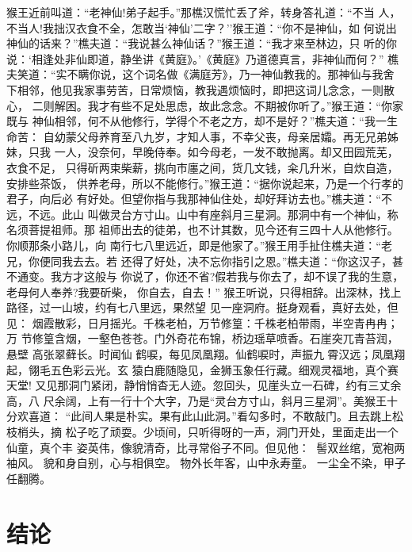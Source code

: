 \documentclass[]{style/zjuthesis}
\begin{document}
猴王近前叫道：``老神仙!弟子起手。''那樵汉慌忙丢了斧，转身答礼道：``不当
人，不当人!我拙汉衣食不全，怎敢当`神仙'二字？''猴王道：``你不是神仙，如
何说出神仙的话来？''樵夫道：``我说甚么神仙话？''猴王道：``我才来至林边，只
听的你说：`相逢处非仙即道，静坐讲《黄庭》。'《黄庭》乃道德真言，非神仙而何？''
樵夫笑道：``实不瞒你说，这个词名做《满庭芳》，乃一神仙教我的。那神仙与我舍
下相邻，他见我家事劳苦，日常烦恼，教我遇烦恼时，即把这词儿念念，一则散心，
二则解困。我才有些不足处思虑，故此念念。不期被你听了。''猴王道：``你家既与
神仙相邻，何不从他修行，学得个不老之方，却不是好？''樵夫道：``我一生命苦：
自幼蒙父母养育至八九岁，才知人事，不幸父丧，母亲居孀。再无兄弟姊妹，只我
一人，没奈何，早晚侍奉。如今母老，一发不敢抛离。却又田园荒芜，衣食不足，
只得斫两束柴薪，挑向市廛之间，货几文钱，籴几升米，自炊自造，安排些茶饭，
供养老母，所以不能修行。''猴王道：``据你说起来，乃是一个行孝的君子，向后必
有好处。但望你指与我那神仙住处，却好拜访去也。''樵夫道：``不远，不远。此山
叫做灵台方寸山。山中有座斜月三星洞。那洞中有一个神仙，称名须菩提祖师。那
祖师出去的徒弟，也不计其数，见今还有三四十人从他修行。你顺那条小路儿，向
南行七八里远近，即是他家了。''猴王用手扯住樵夫道：``老兄，你便同我去去。若
还得了好处，决不忘你指引之恩。''樵夫道：``你这汉子，甚不通变。我方才这般与
你说了，你还不省?假若我与你去了，却不误了我的生意，老母何人奉养?我要斫柴，
你自去，自去！''
猴王听说，只得相辞。出深林，找上路径，过一山坡，约有七八里远，果然望
见一座洞府。挺身观看，真好去处，但见：
烟霞散彩，日月摇光。千株老柏，万节修篁：千株老柏带雨，半空青冉冉；万
节修篁含烟，一壑色苍苍。门外奇花布锦，桥边瑶草喷香。石崖突兀青苔润，悬壁
高张翠藓长。时闻仙
鹤唳，每见凤凰翔。仙鹤唳时，声振九霄汉远；凤凰翔起，翎毛五色彩云光。玄
猿白鹿随隐见，金狮玉象任行藏。细观灵福地，真个赛天堂!
又见那洞门紧闭，静悄悄杳无人迹。忽回头，见崖头立一石碑，约有三丈余高，八
尺余阔，上有一行十个大字，乃是``灵台方寸山，斜月三星洞''。美猴王十分欢喜道：
``此间人果是朴实。果有此山此洞。''看勾多时，不敢敲门。且去跳上松枝梢头，摘
松子吃了顽耍。少顷间，只听得呀的一声，洞门开处，里面走出一个仙童，真个丰
姿英伟，像貌清奇，比寻常俗子不同。但见他： 髻双丝绾，宽袍两袖风。
貌和身自别，心与相俱空。 物外长年客，山中永寿童。
一尘全不染，甲子任翻腾。

\chapter{结论}
\end{document}
